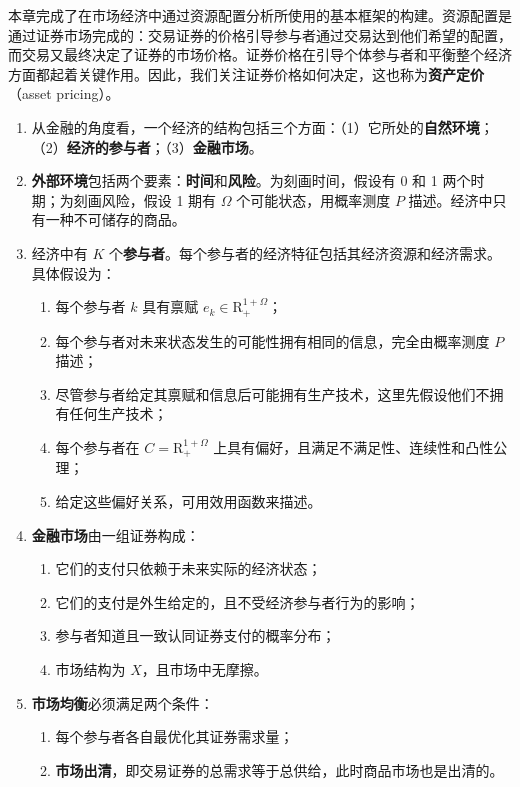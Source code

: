 \begin{tcolorbox}[knowledge,title=2.7 本章小结]
本章完成了在市场经济中通过资源配置分析所使用的基本框架的构建。资源配置是通过证券市场完成的：交易证券的价格引导参与者通过交易达到他们希望的配置，而交易又最终决定了证券的市场价格。证券价格在引导个体参与者和平衡整个经济方面都起着关键作用。因此，我们关注证券价格如何决定，这也称为\textbf{资产定价}（asset pricing）。

\begin{enumerate}
    \item 从金融的角度看，一个经济的结构包括三个方面：（1）它所处的\textbf{自然环境}；（2）\textbf{经济的参与者}；（3）\textbf{金融市场}。

    \item \textbf{外部环境}包括两个要素：\textbf{时间}和\textbf{风险}。为刻画时间，假设有 0 和 1 两个时期；为刻画风险，假设 1 期有 $\Omega$ 个可能状态，用概率测度 $P$ 描述。经济中只有一种不可储存的商品。

    \item 经济中有 $K$ 个\textbf{参与者}。每个参与者的经济特征包括其经济资源和经济需求。具体假设为：
    \begin{enumerate}[label=(\alph*)]
        \item 每个参与者 $k$ 具有禀赋 $e_k\in\mathrm{R}^{1+\Omega}_{+}$；
        \item 每个参与者对未来状态发生的可能性拥有相同的信息，完全由概率测度 $P$ 描述；
        \item 尽管参与者给定其禀赋和信息后可能拥有生产技术，这里先假设他们不拥有任何生产技术；
        \item 每个参与者在 $C=\mathrm{R}^{1+\Omega}_{+}$ 上具有偏好，且满足不满足性、连续性和凸性公理；
        \item 给定这些偏好关系，可用效用函数来描述。
    \end{enumerate}

    \item \textbf{金融市场}由一组证券构成：
    \begin{enumerate}[label=(\alph*)]
        \item 它们的支付只依赖于未来实际的经济状态；
        \item 它们的支付是外生给定的，且不受经济参与者行为的影响；
        \item 参与者知道且一致认同证券支付的概率分布；
        \item 市场结构为 $X$，且市场中无摩擦。
    \end{enumerate}

    \item \textbf{市场均衡}必须满足两个条件：
    \begin{enumerate}[label=(\alph*)]
        \item 每个参与者各自最优化其证券需求量；
        \item \textbf{市场出清}，即交易证券的总需求等于总供给，此时商品市场也是出清的。
    \end{enumerate}


\end{enumerate}
\end{tcolorbox}
